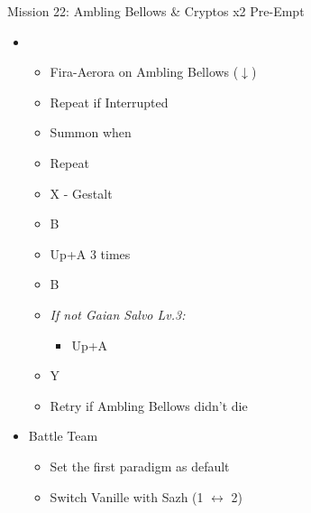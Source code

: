 	\begin{battle}[0:26]{Mission 22: Ambling Bellows \& Cryptos x2 Pre-Empt}
		\begin{itemize}
			\item \second
			      \begin{itemize}
				      \item Fira-Aerora on Ambling Bellows ($\downarrow$)
				      \item Repeat if Interrupted
				      \item Summon when \stagger\
				      \item Repeat
				      \item X - Gestalt
				      \item B
				      \item Up+A 3 times
				      \item B
				      \item \textit{If not Gaian Salvo Lv.3:}
					  \begin{itemize}
						\item Up+A
						\end{itemize}
				      \item Y
				      \item Retry if Ambling Bellows didn't die
			      \end{itemize}
		\end{itemize}
	\end{battle}

	\renewcommand{\sixth}{[6] Aggression (\com/\rav/\com)}

	\begin{menu}
		\begin{itemize}
			\paradigm
			\begin{itemize}
				\item Battle Team
				      \begin{itemize}
					      \item Set the first paradigm as default
					      \item Switch Vanille with Sazh (1 $\leftrightarrow$ 2)
				      \end{itemize}
			\end{itemize}
		\end{itemize}
	\end{menu}
	
